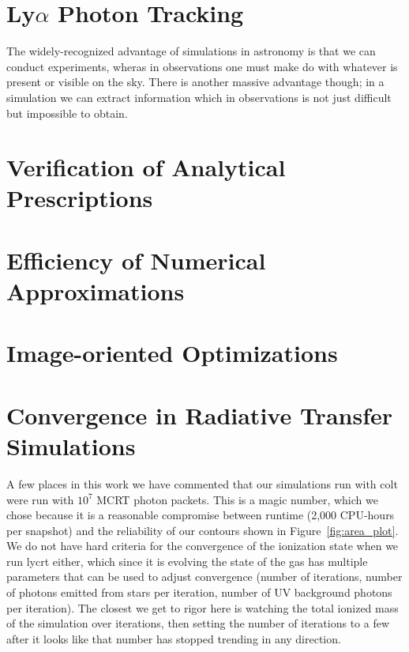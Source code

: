 \section{Ly$\alpha$ Photon Tracking}
The widely-recognized advantage of simulations in astronomy is that we can conduct experiments, wheras in observations one must make do with whatever is present or visible on the sky.
There is another massive advantage though; in a simulation we can extract information which in observations is not just difficult but impossible to obtain.

\section{Verification of Analytical Prescriptions}


\section{Efficiency of Numerical Approximations}


\section{Image-oriented Optimizations}


\section{Convergence in Radiative Transfer Simulations}
A few places in this work we have commented that our simulations run with {\sc colt} were run with $10^{7}$ MCRT photon packets.
This is a magic number, which we chose because it is a reasonable compromise between runtime (2,000 CPU-hours per snapshot) and the reliability of our contours shown in Figure~\ref{fig:area_plot}.
We do not have hard criteria for the convergence of the ionization state when we run {\sc lycrt} either, which since it is evolving the state of the gas has multiple parameters that can be used to adjust convergence (number of iterations, number of photons emitted from stars per iteration, number of UV background photons per iteration).
The closest we get to rigor here is watching the total ionized mass of the simulation over iterations, then setting the number of iterations to a few after it looks like that number has stopped trending in any direction.

